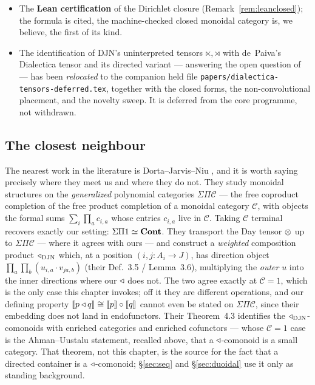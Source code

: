 \begin{itemize}[nosep]
  formula $\ihom pq_\star=\prod_I q\tri(p[I]\star y)$ specialising to Spivak's
  three, graded \textsf{[computed]}.
\item The \textbf{Lean certification} of the Dirichlet closure
  (Remark~\ref{rem:leanclosed}); the formula is cited, the machine-checked
  closed monoidal category is, we believe, the first of its kind.
\item The identification of DJN's uninterpreted tensors $\ltimes,\rtimes$ with
  de~Paiva's Dialectica tensor and its directed variant --- answering the open
  question of \cite[\S6]{DJN23} --- has been \emph{relocated} to the companion
  held file \texttt{papers/dialectica-tensors-deferred.tex}, together with the
  closed forms, the non-convolutional placement, and the novelty sweep. It is
  deferred from the core programme, not withdrawn.
\end{itemize}

\subsection*{The closest neighbour}

The nearest work in the literature is Dorta--Jarvis--Niu \cite{DJN23}, and it is
worth saying precisely where they meet us and where they do not. They study
monoidal structures on the \emph{generalized} polynomial categories
$\Sigma\Pi\mathcal C$ --- the free coproduct completion of the free product
completion of a monoidal category $\mathcal C$, with objects the formal sums
$\sum_i\prod_a c_{i,a}$ whose entries $c_{i,a}$ live in $\mathcal C$. Taking
$\mathcal C$ terminal recovers exactly our setting: $\Sigma\Pi 1\simeq\mathbf{Cont}$.
They transport the Day tensor $\mathbin{\otimes}$ up to $\Sigma\Pi\mathcal C$ --- where it
agrees with ours --- and construct a \emph{weighted} composition product
$\mathbin{\triangleleft}_{\mathrm{DJN}}$ which, at a position $(i,j\colon A_i\to J)$, has direction
object $\prod_{a}\prod_{b}(u_{i,a}\cdot v_{ja,b})$ (their Def.~3.5 / Lemma~3.6),
multiplying the \emph{outer} $u$ into the inner directions where our $\mathbin{\triangleleft}$ does
not. The two agree exactly at $\mathcal C=1$, which is the only case this chapter
invokes; off it they are different operations, and our defining property
$\llbracket p\mathbin{\triangleleft} q \rrbracket\cong\llbracket p \rrbracket\circ\llbracket q \rrbracket$ cannot even be stated on
$\Sigma\Pi\mathcal C$, since their embedding does not land in endofunctors.
Their Theorem~4.3 identifies the $\mathbin{\triangleleft}_{\mathrm{DJN}}$-comonoids
with enriched categories and enriched cofunctors --- whose $\mathcal C=1$ case is
the Ahman--Uustalu statement, recalled above, that a $\mathbin{\triangleleft}$-comonoid is a small
category. That theorem, not this chapter, is the source for the fact that a
directed container is a $\mathbin{\triangleleft}$-comonoid; §\ref{sec:seq} and §\ref{sec:duoidal}
use it only as standing background.

